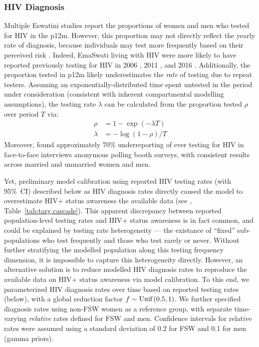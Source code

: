 \subsubsection{HIV Diagnosis}\label{mod.par.cascade.dx}
Multiple Eswatini studies report the proportions of women and men who tested for HIV in the p12m.
However, this proportion may not directly reflect the yearly rate of diagnosis,
because individuals may test more frequently based on their perceived risk \cite{Witzel2017}.
Indeed, EmaSwati living with HIV were more likely to have reported previously testing for HIV in
2006 \cite[Table~14.9]{SDHS2006}, 2011 \cite[Table~5]{SHIMS1T}, and 2016 \cite[Table~7.3]{SHIMS2}.
Additionally, the proportion tested in p12m
likely underestimates the \emph{rate} of testing due to repeat testers.
Assuming an exponentially-distributed time spent untested in the period under consideration
(consistent with inherent compartmental modelling assumptions),
the testing rate $\lambda$ can be calculated
from the proportion tested $\rho$ over period $T$ via:
\begin{equation}\label{eq:exp.decay}
  \begin{aligned}
       \rho &= 1 - \exp{(-\lambda T)} \\
    \lambda &= - \log{(1-\rho)} / T
  \end{aligned}
\end{equation}
Moreover, \cite{Behanzin2013} found approximately 70\% underreporting of ever testing for HIV
in face-to-face interviews \vs anonymous polling booth surveys,
with consistent results across married and unmarried women and men.
\par
Yet, preliminary model calibration
using reported HIV testing rates (with 95\%~CI) described below as HIV diagnosis rates directly
caused the model to overestimate HIV+ status awareness \vs the available data
(see , Table~\ref{tab:targ.cascade}).
This apparent discrepancy between reported population-level testing rates and HIV+ status awareness
is in fact common, and could be explained by testing rate heterogeneity \cite{Maheu-Giroux2019f90}
--- \ie the existance of ``fixed'' sub-populations
who test frequently and those who test rarely or never.
Without further stratifying the modelled population along this testing frequency dimension,
it is impossible to capture this heterogeneity directly.
However, an alternative solution is to reduce modelled HIV diagnosis rates
to reproduce the available data on HIV+ status awareness via model calibration.
To this end, we parameterized HIV diagnosis rates over time based on reported testing rates (below),
with a global reduction factor $f \sim \textnormal{Unif}\,(0.5,1)$.
We further specified diagnosis rates using non-FSW women as a reference group,
with separate time-varying \emph{relative} rates defined for FSW and men.
Confidence intervals for relative rates were assumed using
a standard deviation of 0.2 for FSW and 0.1 for men (gamma priors).
